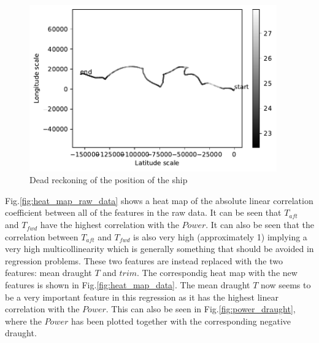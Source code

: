 \begin{figure}[H]
\begin{center}\includegraphics[width = 0.95\textwidth]{figures/dead_reckoning.pdf}\end{center}
\vspace{-0.7cm}
\caption{Dead reckoning of the position of the ship}
\label{fig:dead_reckoning}
\end{figure}
Fig.\ref{fig:heat_map_raw_data} shows a heat map of the absolute
linear correlation coefficient between all of the features in the raw
data. It can be seen that $T_{aft}$ and $T_{fwd}$ have the highest
correlation with the $Power$. It can also be seen that the correlation
between $T_{aft}$ and $T_{fwd}$ is also very high (approximately 1)
implying a very high multicollinearity which is generally something that
should be avoided in regression problems. These two features are instead
replaced with the two features: mean draught $T$ and $trim$. The
correspondig heat map with the new features is shown in
Fig.\ref{fig:heat_map_data}. The mean draught $T$ now seems to
be a very important feature in this regression as it has the highest
linear correlation with the $Power$. This can also be seen in
Fig.\ref{fig:power_draught}, where the $Power$ has been
plotted together with the corresponding negative draught.

